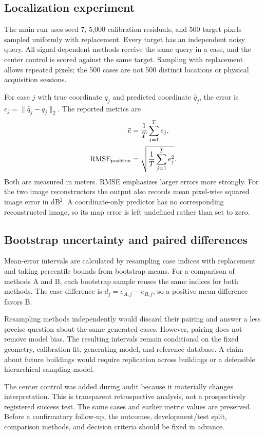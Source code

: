 \documentclass[conference,letterpaper]{IEEEtran}
\begin{document}
\subsection{Localization experiment}
The main run uses seed 7, 5,000 calibration residuals, and 500 target pixels sampled uniformly with replacement. Every target has an independent noisy query. All signal-dependent methods receive the same query in a case, and the center control is scored against the same target. Sampling with replacement allows repeated pixels; the 500 cases are not 500 distinct locations or physical acquisition sessions.

For case $j$ with true coordinate $q_j$ and predicted coordinate $\widehat q_j$, the error is $e_j=\|\widehat q_j-q_j\|_2$. The reported metrics are
\begin{align}
\overline e&=\frac{1}{T}\sum_{j=1}^{T} e_j,\\
\operatorname{RMSE}_{\rm position}&=\sqrt{\frac{1}{T}\sum_{j=1}^{T}e_j^2}.
\end{align}
Both are measured in meters. RMSE emphasizes larger errors more strongly. For the two image reconstructors the output also records mean pixel-wise squared image error in dB$^2$. A coordinate-only predictor has no corresponding reconstructed image, so its map error is left undefined rather than set to zero.

\subsection{Bootstrap uncertainty and paired differences}
Mean-error intervals are calculated by resampling case indices with replacement and taking percentile bounds from bootstrap means. For a comparison of methods A and B, each bootstrap sample reuses the same indices for both methods. The case difference is $d_j=e_{A,j}-e_{B,j}$, so a positive mean difference favors B.

Resampling methods independently would discard their pairing and answer a less precise question about the same generated cases. However, pairing does not remove model bias. The resulting intervals remain conditional on the fixed geometry, calibration fit, generating model, and reference database. A claim about future buildings would require replication across buildings or a defensible hierarchical sampling model.

The center control was added during audit because it materially changes interpretation. This is transparent retrospective analysis, not a prospectively registered success test. The same cases and earlier metric values are preserved. Before a confirmatory follow-up, the outcomes, development/test split, comparison methods, and decision criteria should be fixed in advance.
\end{document}
